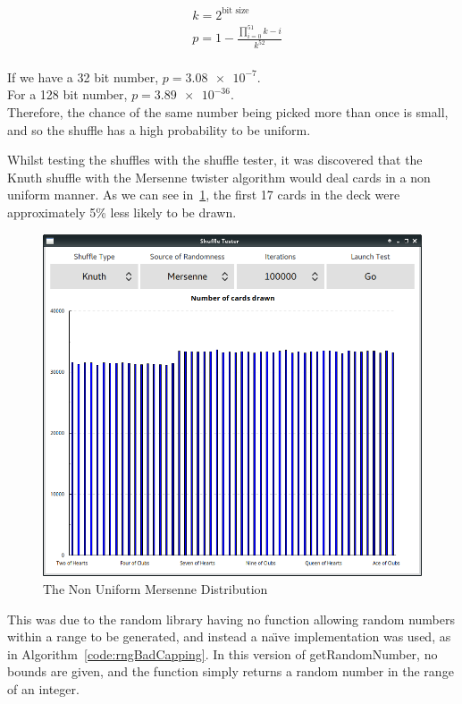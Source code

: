 \begin{equation} \label{eq:probSameNumFast}
\begin{split}
& k = 2^\text{bit size}\\
& p = 1 - \frac{\displaystyle\prod_{i=0}^{51} k - i}{k^{52}}
\end{split}
\end{equation}\\

If we have a 32 bit number, $p = 3.08\num{e-7}$.\\
For a 128 bit number, $p = 3.89\num{e-36}$.\\

Therefore, the chance of the same number being picked more than once is small,
and so the shuffle has a high probability to be uniform.

Whilst testing the shuffles with the shuffle tester, it was discovered that
the Knuth shuffle with the Mersenne twister algorithm would deal cards in a
non uniform manner. As we can see in~\ref{fig:faultymersenne}, the first 17
cards in the deck were approximately 5\% less likely to be drawn.

\begin{figure}[H]
    \centering
    \includegraphics[width=0.8\linewidth]{../images/faultymersenne.png}
    \caption{The Non Uniform Mersenne Distribution}%
    \label{fig:faultymersenne}
\end{figure}

This was due to the random library having no function allowing random numbers
within a range to be generated, and instead a na\"{\i}ve implementation was
used, as in Algorithm~\ref{code:rngBadCapping}. In this version of
getRandomNumber, no bounds are given, and the function simply returns a
random number in the range of an integer.

